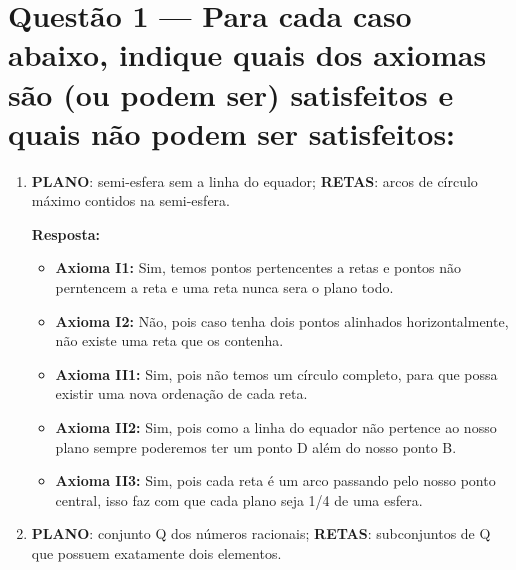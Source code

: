 \documentclass[12pt,a4paper]{article}
\newcommand{\answer}[1]{\textcolor{answer}{#1}}
\begin{document}
\section*{Questão 1 --- Para cada caso abaixo, indique quais dos axiomas são (ou podem ser) satisfeitos e quais não podem ser satisfeitos:}
    \begin{enumerate}[label= (\roman*)]
        \item \textbf{PLANO}: semi-esfera sem a linha do equador;
        \textbf{RETAS}: arcos de círculo máximo contidos na semi-esfera.
        
        \answer{
            \textbf{Resposta:}
            \begin{itemize}
                \item \textbf{Axioma I1:} Sim, temos pontos pertencentes a retas e pontos não perntencem a reta e uma reta nunca sera o plano todo.
                \item \textbf{Axioma I2:} Não, pois caso tenha dois pontos alinhados horizontalmente, não existe uma reta que os contenha.
                \item \textbf{Axioma II1:} Sim, pois não temos um círculo completo, para que possa existir uma nova ordenação de cada reta.
                \item \textbf{Axioma II2:} Sim, pois como a linha do equador não pertence ao nosso plano sempre poderemos ter um ponto D além do nosso ponto B.
                \item \textbf{Axioma II3:} Sim, pois cada reta é um arco passando pelo nosso ponto central, isso faz com que cada plano seja 1/4 de uma esfera.
            \end{itemize}
        }

        \item \textbf{PLANO}: conjunto Q dos números racionais;
        \textbf{RETAS}: subconjuntos de Q que possuem exatamente dois elementos.

        \vspace{1cm}


\end{enumerate}
\end{document}
